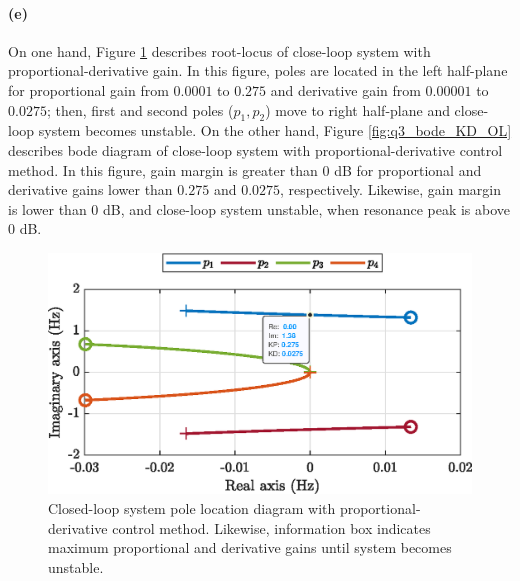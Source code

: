 \paragraph{(e)} On one hand,  Figure  \ref{fig:q3_rlocus_KD_CL} describes root-locus of close-loop system with proportional-derivative gain. In this figure, poles are located in the left half-plane for proportional gain from $0.0001$ to $0.275$ and derivative gain from $0.00001$ to $0.0275$; then, first and second poles ($p_1, p_2$) move to right half-plane and close-loop system becomes unstable. On the other hand, Figure \ref{fig:q3_bode_KD_OL} describes bode diagram of close-loop system with proportional-derivative control method. In this figure, gain margin is greater than $0$ dB for proportional and derivative gains lower than $0.275$ and $0.0275$, respectively. Likewise, gain margin is lower than $0$ dB, and close-loop system unstable, when resonance peak is above $0$  dB. 


\begin{figure}[h!]
	\centering
	\includegraphics{images/question3/q3_rlocus_KD_CL.eps}
	\caption{Closed-loop system pole location diagram with proportional-derivative control method. Likewise, information box indicates maximum proportional and derivative gains until system becomes unstable.}
	\label{fig:q3_rlocus_KD_CL}
\end{figure}


